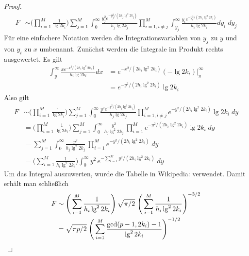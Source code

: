 \documentclass[a4paper, 11pt, ngerman]{article}
\theoremstyle{definition}
\theoremstyle{plain}
\theoremstyle{remark}
\begin{document}
\begin{proof}
    \begin{align*}
        F & \sim
        \Bigg (\prod_{i = 1}^M \frac 1 {\lg 2k_i} \Bigg )
        \sum_{j = 1}^M \int_0^\infty
        \frac {y_j^2 e^{-y_j^2 / (2h_j \lg^2 2k_j)}} {h_j \lg 2k_j}
        \prod_{i = 1, i \ne j}^M \int_{y_j}^{\infty}
        \frac {y_i e^{-y_i^2 / (2h_i \lg^2 2k_i)}} {h_i \lg 2k_i} dy_i \; dy_j
    \end{align*}
    Für eine einfachere Notation werden die Integrationsvariablen von $y_j$ zu $y$ und von $y_i$ zu $x$ umbenannt. Zunächst werden die Integrale im Produkt rechts ausgewertet. Es gilt
    \begin{align*}
        \int_{y}^{\infty}
        \frac {x e^{-x^2 / (2h_i \lg^2 2k_i)}} {h_i \lg 2k_i} dx
         & = e^{-x^2/(2h_i \lg^2 2k_i)} (- \lg 2k_i) \Big \vert_{y}^{\infty} \\
         & = e^{-y^2/(2h_i \lg^2 2k_i)} \lg 2k_i
    \end{align*}
    Also gilt
    \begin{align*}
        F & \sim
        \Bigg (\prod_{i = 1}^M \frac 1 {\lg 2k_i} \Bigg )
        \sum_{j = 1}^M \int_0^\infty
        \frac {y^2 e^{-y^2 / (2h_j \lg^2 2k_j)}} {h_j \lg 2k_j}
        \prod_{i = 1, i \ne j}^M e^{-y^2/(2h_i \lg^2 2k_i)} \lg 2k_i \; dy \\
          & = \Bigg ( \prod_{i = 1}^M \frac 1 {\lg 2k_i} \Bigg )
        \sum_{j = 1}^M \int_0^\infty
        \frac {y^2} {h_j \lg^2 2k_j} \,
        \prod_{i = 1}^M e^{-y^2/(2h_i \lg^2 2k_i)} \lg 2k_i \; dy          \\
          & = \sum_{j = 1}^M \int_0^\infty
        \frac {y^2} {h_j \lg^2 2k_j} \,
        \prod_{i = 1}^M e^{-y^2/(2h_i \lg^2 2k_i)} \; dy                   \\
          & = \Bigg ( \sum_{i = 1}^M \frac 1 {h_i \lg^2 2k_i} \Bigg )
        \int_0^\infty
        y^2 \,e^{- \sum_{i = 1}^M y^2/(2h_i \lg^2 2k_i)} \; dy
    \end{align*}
    Um das Integral auszuwerten, wurde die Tabelle in Wikipedia: \cite{gint} verwendet. Damit erhält man schließlich
    \begin{align*}
        F & \sim \Bigg (\sum_{i = 1}^M \frac 1 {h_i \lg^2 2k_i} \Bigg ) \,
        \sqrt {\pi / 2} \
        \Bigg ( \sum_{i = 1}^M \frac 1 {h_i \lg^2 2k_i} \Bigg )^{-3/2}     \\
          & = \sqrt{\pi p / 2} \; \Bigg (
        \sum_{i = 1}^M \frac {\gcd(p - 1, 2k_i) - 1} {\lg^2 2k_i} \Bigg )^{-1/2} \qedhere
    \end{align*}
\end{proof}
\end{document}

